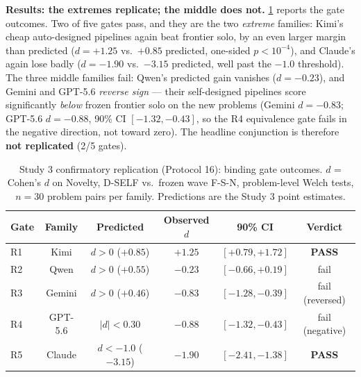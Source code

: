 \documentclass[12pt,a4paper]{article}
\begin{document}
\textbf{Results: the extremes replicate; the middle does not.}
\cref{tab:study3conf-gates} reports the gate outcomes. Two of five gates
pass, and they are the two \emph{extreme} families: Kimi's cheap
auto-designed pipelines again beat frontier solo, by an even larger margin
than predicted ($d = +1.25$ vs.\ $+0.85$ predicted, one-sided
$p < 10^{-4}$), and Claude's again lose badly ($d = -1.90$ vs.\ $-3.15$
predicted, well past the $-1.0$ threshold). The three middle families fail:
Qwen's predicted gain vanishes ($d = -0.23$), and Gemini and GPT-5.6
\emph{reverse sign} --- their self-designed pipelines score significantly
\emph{below} frozen frontier solo on the new problems (Gemini $d = -0.83$;
GPT-5.6 $d = -0.88$, 90\% CI $[-1.32, -0.43]$, so the R4 equivalence gate
fails in the negative direction, not toward zero). The headline conjunction
is therefore \textbf{not replicated} (2/5 gates).

\begin{table}[ht]
  \centering
  \caption{Study 3 confirmatory replication (Protocol 16): binding gate
  outcomes. $d$ = Cohen's $d$ on Novelty, D-SELF vs.\ frozen wave F-S-N,
  problem-level Welch tests, $n = 30$ problem pairs per family. Predictions
  are the Study 3 point estimates.}
  \label{tab:study3conf-gates}
  \begin{tabular}{@{}l c c c c c@{}}
    \toprule
    \textbf{Gate} & \textbf{Family} & \textbf{Predicted} & \textbf{Observed $d$}
      & \textbf{90\% CI} & \textbf{Verdict} \\
    \midrule
    R1 & Kimi     & $d > 0$ ($+0.85$)          & $+1.25$ & $[+0.79, +1.72]$  & \textbf{PASS} \\
    R2 & Qwen     & $d > 0$ ($+0.55$)          & $-0.23$ & $[-0.66, +0.19]$  & fail \\
    R3 & Gemini   & $d > 0$ ($+0.46$)          & $-0.83$ & $[-1.28, -0.39]$  & fail (reversed) \\
    R4 & GPT-5.6  & $|d| < 0.30$               & $-0.88$ & $[-1.32, -0.43]$  & fail (negative) \\
    R5 & Claude   & $d < -1.0$ ($-3.15$)       & $-1.90$ & $[-2.41, -1.38]$  & \textbf{PASS} \\
    \bottomrule
  \end{tabular}
\end{table}
\end{document}
